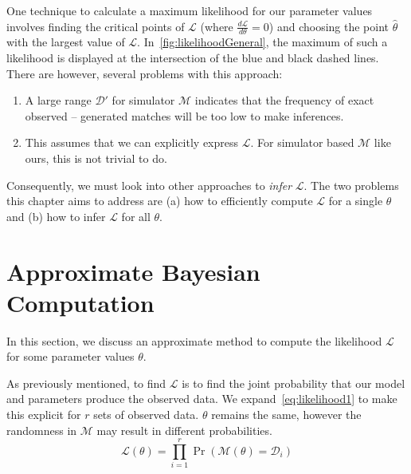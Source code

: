 One technique to calculate a maximum likelihood for our parameter values involves finding the critical points of
$\mathcal{L}$ (where $\frac{d\mathcal{L}}{d\theta} = 0$) and choosing the point $\hat{\theta}$ with the largest value
of $\mathcal{L}$.
In~\autoref{fig:likelihoodGeneral}, the maximum of such a likelihood is displayed at the intersection of the blue and
black dashed lines.
There are however, several problems with this approach:
\begin{enumerate}
    \item A large range $\mathcal{D}'$ for simulator $\mathcal{M}$ indicates that the frequency of exact observed --
        generated matches will be too low to make inferences.
    \item This assumes that we can explicitly express $\mathcal{L}$.
        For simulator based $\mathcal{M}$ like ours, this is not trivial to do.
\end{enumerate}
Consequently, we must look into other approaches to \textit{infer} $\mathcal{L}$.
The two problems this chapter aims to address are (a) how to efficiently compute $\mathcal{L}$ for a single $\theta$
and (b) how to infer $\mathcal{L}$ for all $\theta$.

\section{Approximate Bayesian Computation}\label{sec:approximateBayesianComputation}
In this section, we discuss an approximate method to compute the likelihood $\mathcal{L}$ for some parameter values
$\theta$.

As previously mentioned, to find $\mathcal{L}$ is to find the joint probability that our model and parameters produce
the observed data.
We expand~\autoref{eq:likelihood1} to make this explicit for $r$ sets of observed data.
$\theta$ remains the same, however the randomness in $\mathcal{M}$ may result in different probabilities.
\begin{equation}
    \mathcal{L}(\theta) = \prod_{i=1}^{r} \Pr\left(\mathcal{M}(\theta) = \mathcal{D}_i \right)
\end{equation}

